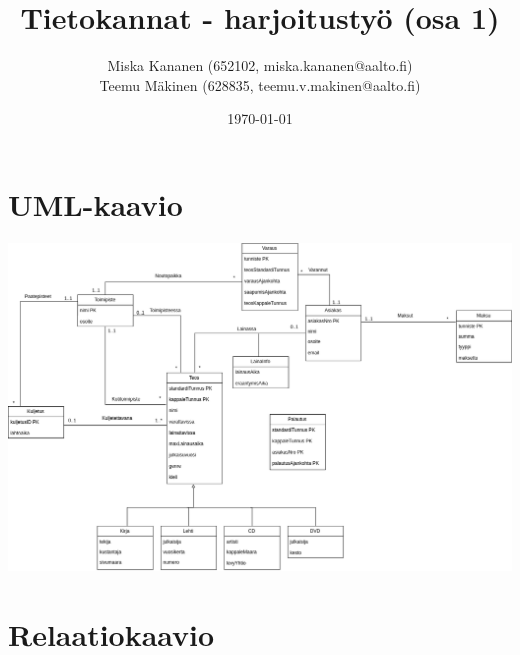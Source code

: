 \documentclass[12pt,titlepage] {article}
\begin{document}
\title {Tietokannat - harjoitustyö (osa 1)}
\author {Miska Kananen (652102, miska.kananen@aalto.fi) \\ Teemu Mäkinen (628835, teemu.v.makinen@aalto.fi)}
\date {\today}
\maketitle

\section {UML-kaavio}

\includegraphics[width=\textwidth]{kirjasto.png}

\section {Relaatiokaavio}
\end{document}

